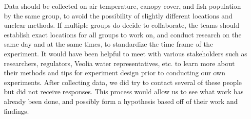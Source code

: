 \documentclass{article}\usepackage[]{graphicx}\usepackage[]{color}
\begin{document}
Data should be collected on air temperature, canopy cover, and fish population by the same group, to avoid the possibility of slightly different locations and unclear methods. If multiple groups do decide to collaborate, the teams should establish exact locations for all groups to work on, and conduct research on the same day and at the same times, to standardize the time frame of the experiment. It would have been helpful to meet with various stakeholders such as researchers, regulators, Veolia water representatives, etc. to learn more about their methods and tips for experiment design prior to conducting our own experiments. After collecting data, we did try to contact several of these people but did not receive responses. This process would allow us to see what work has already been done, and possibly form a hypothesis based off of their work and findings.
\end{document}
